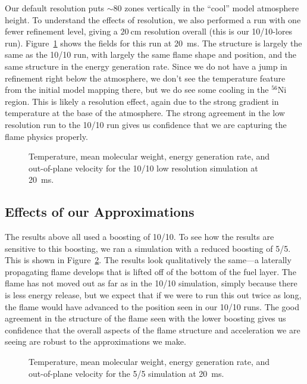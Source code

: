 \documentclass[preprint,times,tighten]{aastex63}
\newcommand{\isot}[2]{$^{#2}\mathrm{#1}$}
\newcommand{\MarginPar}[1]{
    \marginpar{\vskip-\baselineskip%
               \raggedright%
               \tiny\sffamily%
               {\color{red}\hrule%
               \smallskip%
               #1\par%
               \smallskip%
               \hrule}}%
}
\begin{document}
Our default resolution puts $\sim 80$ zones vertically in the
``cool'' \MarginPar{double check} model atmosphere height.  To
understand the effects of resolution, we also performed a run with one
fewer refinement level, giving a $20~\mbox{cm}$ resolution overall (this is our
10/10-lores run).  Figure~\ref{fig:10_10_lowres} shows the fields for this run at
20~ms.  The structure is largely the same as the 10/10 run, with
largely the same flame shape and position, and the same structure in
the energy generation rate.  Since we do not have a jump in refinement
right below the atmosphere, we don't see the temperature feature from
the initial model mapping there, but we do see some cooling in the
\isot{Ni}{56} region.  This is likely a resolution effect, again due
to the strong gradient in temperature at the base of the atmosphere.
The strong agreement in the low resolution run to the 10/10 run gives
us confidence that we are capturing the flame physics properly.

\begin{figure}[t]
\centering
{}
\caption{\label{fig:10_10_lowres} Temperature, mean molecular weight,
  energy generation rate, and out-of-plane velocity for the 10/10 low
  resolution simulation at 20~ms.}
\end{figure}




\subsection{Effects of our Approximations}

The results above all used a boosting of 10/10.  To see how the
results are sensitive to this boosting, we ran a simulation with a reduced
boosting of 5/5.  This is shown in Figure~\ref{fig:5_5_overview}.  The
results look qualitatively the same---a laterally propagating flame
develops that is lifted off of the bottom of the fuel layer.  The
flame has not moved out as far as in the 10/10 simulation, simply
because there is less energy release, but we expect that if we were to
run this out twice as long, the flame would have advanced to the
position seen in our 10/10 runs.  The good agreement in the structure
of the flame seen with the lower boosting gives us confidence that the
overall aspects of the flame structure and acceleration we are seeing
are robust to the approximations we make.

\begin{figure}[t]
\centering
{}
\caption{\label{fig:5_5_overview} Temperature, mean molecular weight, energy generation rate, and out-of-plane velocity for the 5/5 simulation at 20~ms.}
\end{figure}
\end{document}

